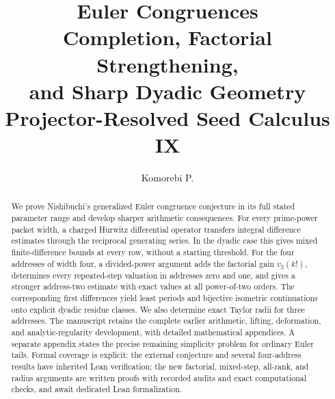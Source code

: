 \documentclass[11pt]{article}
\title{\textbf{Euler Congruences}\\[5pt]
  \Large Completion, Factorial Strengthening,\\ and Sharp Dyadic Geometry\\[7pt]
  \large Projector-Resolved Seed Calculus IX}
\author{Komorebi P.}
\date{}
\theoremstyle{definition}
\theoremstyle{remark}
\numberwithin{equation}{section}
\begin{document}
\KomorebiCover

\relax
\begin{abstract}
We prove Nishibuchi's generalized Euler congruence conjecture in its full stated parameter range and develop sharper arithmetic consequences. For every prime-power packet width, a charged Hurwitz differential operator transfers integral difference estimates through the reciprocal generating series. In the dyadic case this gives mixed finite-difference bounds at every row, without a starting threshold. For the four addresses of width four, a divided-power argument adds the factorial gain $v_2(k!)$, determines every repeated-step valuation in addresses zero and one, and gives a stronger address-two estimate with exact values at all power-of-two orders. The corresponding first differences yield least periods and bijective isometric continuations onto explicit dyadic residue classes. We also determine exact Taylor radii for three addresses. The manuscript retains the complete earlier arithmetic, lifting, deformation, and analytic-regularity development, with detailed mathematical appendices. A separate appendix states the precise remaining simplicity problem for ordinary Euler tails. Formal coverage is explicit: the external conjecture and several four-address results have inherited Lean verification; the new factorial, mixed-step, all-rank, and radius arguments are written proofs with recorded audits and exact computational checks, and await dedicated Lean formalization.
\end{abstract}




\clearpage
{\small\setlength{\parskip}{0pt}\tableofcontents}
\clearpage


\clearpage

\clearpage




\end{document}
